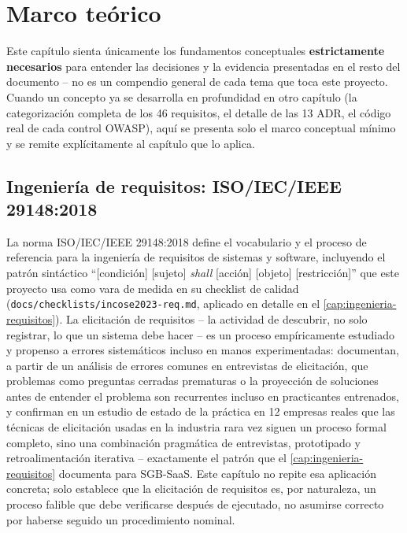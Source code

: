 \chapter{Marco teórico}
\label{cap:marco-teorico}

Este capítulo sienta únicamente los fundamentos conceptuales
\textbf{estrictamente necesarios} para entender las decisiones y la
evidencia presentadas en el resto del documento -- no es un compendio
general de cada tema que toca este proyecto. Cuando un concepto ya se
desarrolla en profundidad en otro capítulo (la categorización completa
de los 46 requisitos, el detalle de las 13 ADR, el código real de cada
control OWASP), aquí se presenta solo el marco conceptual mínimo y se
remite explícitamente al capítulo que lo aplica.

\section{Ingeniería de requisitos: ISO/IEC/IEEE 29148:2018}
\label{sec:mt-requisitos}

La norma ISO/IEC/IEEE 29148:2018 define el vocabulario y el proceso de
referencia para la ingeniería de requisitos de sistemas y software,
incluyendo el patrón sintáctico ``[condición] [sujeto] \emph{shall}
[acción] [objeto] [restricción]'' que este proyecto usa como vara de
medida en su checklist de calidad
(\texttt{docs/checklists/incose2023-req.md}, aplicado en detalle en el
\autoref{cap:ingenieria-requisitos}). La elicitación de requisitos --
la actividad de descubrir, no solo registrar, lo que un sistema debe
hacer -- es un proceso empíricamente estudiado y propenso a errores
sistemáticos incluso en manos experimentadas: \citet{bano2019elicitation}
documentan, a partir de un análisis de errores comunes en entrevistas de
elicitación, que problemas como preguntas cerradas prematuras o la
proyección de soluciones antes de entender el problema son recurrentes
incluso en practicantes entrenados, y \citet{palomares2021elicitation}
confirman en un estudio de estado de la práctica en 12 empresas reales
que las técnicas de elicitación usadas en la industria rara vez siguen
un proceso formal completo, sino una combinación pragmática de entrevistas,
prototipado y retroalimentación iterativa -- exactamente el patrón que el
\autoref{cap:ingenieria-requisitos} documenta para SGB-SaaS. Este
capítulo no repite esa aplicación concreta; solo establece que la
elicitación de requisitos es, por naturaleza, un proceso falible que debe
verificarse después de ejecutado, no asumirse correcto por haberse
seguido un procedimiento nominal.

